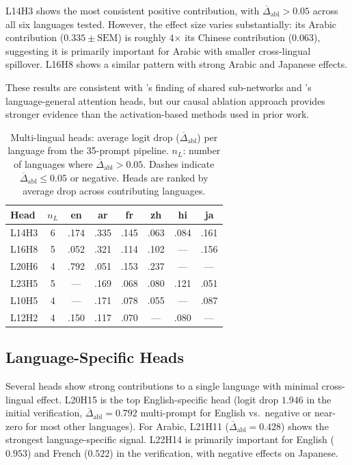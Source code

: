 \documentclass[11pt]{article}
\begin{document}
L14H3 shows the most consistent positive contribution, with $\overline{\Delta}_{\text{abl}} > 0.05$ across all six languages tested.
However, the effect size varies substantially: its Arabic contribution ($0.335 \pm \text{SEM}$) is roughly 4$\times$ its Chinese contribution ($0.063$), suggesting it is primarily important for Arabic with smaller cross-lingual spillover.
L16H8 shows a similar pattern with strong Arabic and Japanese effects.

These results are consistent with \citet{foroutan2022discovering}'s finding of shared sub-networks and \citet{chen2025focusing}'s language-general attention heads, but our causal ablation approach provides stronger evidence than the activation-based methods used in prior work.

\begin{table}[t]
\centering
\small
\begin{tabular}{lccccccc}
\toprule
\textbf{Head} & \textbf{$n_L$} & \textbf{en} & \textbf{ar} & \textbf{fr} & \textbf{zh} & \textbf{hi} & \textbf{ja} \\
\midrule
L14H3  & 6 & .174 & .335 & .145 & .063 & .084 & .161 \\
L16H8  & 5 & .052 & .321 & .114 & .102 & ---  & .156 \\
L20H6  & 4 & .792 & .051 & .153 & .237 & ---  & ---  \\
L23H5  & 5 & ---  & .169 & .068 & .080 & .121 & .051 \\
L10H5  & 4 & ---  & .171 & .078 & .055 & ---  & .087 \\
L12H2  & 4 & .150 & .117 & .070 & ---  & .080 & ---  \\
\bottomrule
\end{tabular}
\caption{Multi-lingual heads: average logit drop ($\overline{\Delta}_{\text{abl}}$) per language from the 35-prompt pipeline. $n_L$: number of languages where $\overline{\Delta}_{\text{abl}} > 0.05$. Dashes indicate $\overline{\Delta}_{\text{abl}} \leq 0.05$ or negative. Heads are ranked by average drop across contributing languages.}
\label{tab:universal}
\end{table}

\subsection{Language-Specific Heads}
\label{sec:results:specific}

Several heads show strong contributions to a single language with minimal cross-lingual effect.
L20H15 is the top English-specific head (logit drop $1.946$ in the initial verification, $\overline{\Delta}_{\text{abl}} = 0.792$ multi-prompt for English vs.\ negative or near-zero for most other languages).
For Arabic, L21H11 ($\overline{\Delta}_{\text{abl}} = 0.428$) shows the strongest language-specific signal.
L22H14 is primarily important for English ($0.953$) and French ($0.522$) in the verification, with negative effects on Japanese.
\end{document}
